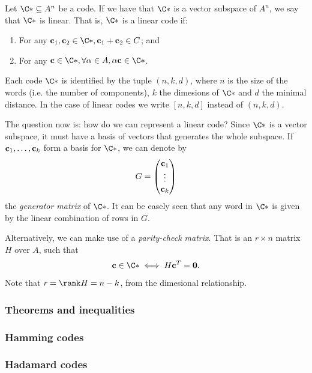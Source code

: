 \documentclass{subfiles}
\begin{document}
    \begin{definition*}
        Let \(\C* \subseteq A^{n}\) be a code. If we have that \(\C*\) is 
            a vector subspace of \(A^{n}\), we say that \(\C*\) is linear.
            That is, \(\C*\) is a linear code if:
            \begin{enumerate}
                \item For any \(\bv{c}_{1}, \bv{c}_{2} \in \C*,
                    \bv{c}_{1} + \bv{c}_{2} \in C\); and

                \item For any \(\bv{c} \in \C*, \forall \alpha \in A, 
                    \alpha\bv{c} \in \C*\).
            \end{enumerate}
    \end{definition*}

    Each code \(\C*\) is identified by the tuple \((n, k, d)\), 
        where \(n\) is the size of the words (i.e. the number of components),
        \(k\) the dimesions of \(\C*\) and \(d\) the minimal distance.
        In the case of linear codes we write \([n, k, d]\) instead of \((n, k, d)\).

    The question now is: how do we can represent a linear code?
        Since \(\C*\) is a vector subspace, it must have a basis of vectors that 
        generates the whole subspace. If \(\mathbf{c}_{1}, \ldots, \mathbf{c}_{k}\)
        form a basis for \(\C*\), we can denote by 
        \[
            G = \begin{pmatrix}
                \mathbf{c}_{1} \\ 
                \vdots     \\ 
                \mathbf{c}_{k} \\
            \end{pmatrix}
        \]
        the \emph{generator matrix} of \(\C*\). It can be easely seen that any 
        word in \(\C*\) is given by the linear combination of rows in \(G\).

    Alternatively, we can make use of a \emph{parity-check matrix}.
        That is an \(r \times n\) matrix \(H\) over \(A\), such that 
        \[
            \bv{c} \in \C* \iff H\bv{c}^{T} = \bv{0}.
        \]
        Note that \(r = \rank H = n - k\), from the dimesional relationship.

    \subsubsection{Theorems and inequalities}
    

    \subsubsection{Hamming codes}
    

    \subsubsection{Hadamard codes}
    
\end{document}
